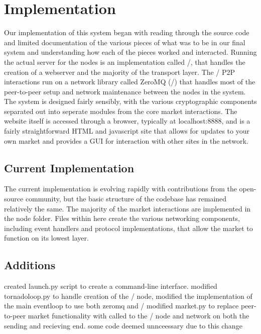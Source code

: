 \documentclass[11pt,twocolumn]{article}
\begin{document}
\section{Implementation}
\label{sec:implementation}
Our implementation of this system began with reading through the source code and limited documentation of the various pieces of what was to be in our final system and understanding how each of the pieces worked and interacted.
Running the actual server for the nodes is an implementation called \Tornado/, that handles the creation of a webserver and the majority of the transport layer.
The \OpenBazaar/ P2P interactions run on a network library called ZeroMQ (\ZMQ/) that handles most of the peer-to-peer setup and network maintenance between the nodes in the system.
The system is designed fairly sensibly, with the various cryptographic components separated out into seperate modules from the core market interactions.
The website itself is accessed through a browser, typically at {\sc localhost:8888}, and is a fairly straightforward HTML and javascript site that allows for updates to your own market and provides a GUI for interaction with other sites in the network.

\subsection{Current Implementation}
The current implementation is evolving rapidly with contributions from the open-source community, but the basic structure of the codebase has remained relatively the same.
The majority of the market interactions are implemented in the node folder.
Files within here create the various networking components, including event handlers and protocol implementations, that allow the market to function on its lowest layer. 

\subsection{Additions}
created launch.py script to create a command-line interface.
modified tornadoloop.py to handle creation of the \Entangled/ node, modified the implementation of the main eventloop to use both zeromq and \Entangled/
modified market.py to replace peer-to-peer market functionality with called to the \Entangled/ node and network on both the sending and recieving end. some code deemed unnceessary due to this change
\end{document}
